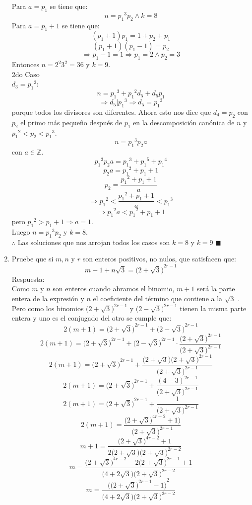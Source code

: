 \documentclass{book}
\newcommand{\Z}{\mathbb{Z}} \def\max{\mathop{\mbox{\rm máx}}} %
\begin{document}
\begin{enumerate}
Para $a= p_1$ se tiene que:
$$n={p_ 1}^3 p_2  \wedge k=8$$
Para $a= p_1 +1$ se tiene que:
$$(p_1+1) p_1 =1+p_2+p_1$$
$$(p_1 +1)(p_1 -1)=p_2$$
$$\Rightarrow p_1-1=1 \Rightarrow p_1 =2 \wedge p_2 =3$$
Entonces $n=2^2 3^2=36$ y $k=9$.\\
2do Caso\\ 
$d_3={p_1}^2$:
$$n={p_1}^3+{p_1}^2 d_5+d_5 p_1$$
$$\Rightarrow d_5|{p_1}^3   \Rightarrow d_5={p_1}^3$$
porque todos los divisores son diferentes.
Ahora esto nos dice que $d_4= p_2$ con $p_2$ el primo más pequeño después de $p_1$ en la descomposición canónica de $n$ y ${p_1}^2<p_2<{p_1}^3$.
$$n={p_1}^3 p_2 a$$ 
con $a\in\Z$.
$${p_1}^3 p_2 a ={p_1}^3+{p_1}^5+{p_1}^4$$
$$p_2 a ={p_1}^2+p_1+1$$
$$p_2  =\frac{{p_1}^2+p_1+1}{a}$$
$$\Rightarrow {p_1}^2<\frac{{p_1}^2+p_1+1}{a}<{p_1}^3$$
$$\Rightarrow {p_1}^2 a<{p_1}^2+p_1+1$$ pero ${p_1}^2>p_1+1\Rightarrow a=1$.\\
Luego $n={p_1}^3 p_2$  y $k=8$.\\
$\therefore$ Las soluciones que nos arrojan todos los casos son $k=8$ y $k=9$ $\blacksquare$\\
			\item Pruebe que si $m,n$  y $r$  son enteros positivos, no nulos, que satisfacen que:  
			$$m+1+n\sqrt{3}={\big(2+\sqrt{3}\big)}^{2r-1}$$
			Respuesta:\\
			Como $m$ y $n$ son enteros cuando abramos el binomio, $m+1$ será la parte entera de la expresión y $n$ el coeficiente del término que contiene a la $\sqrt{3}$ .\\
Pero como los binomios ${\big(2+\sqrt{3}\big)}^{2r-1}$ y ${\big(2-\sqrt{3}\big)}^{2r-1}$ tienen la misma parte entera y uno es el conjugado del otro se cumple que:
$$2(m+1)={\big(2+\sqrt{3}\big)}^{2r-1}+{\big(2-\sqrt{3}\big)}^{2r-1}$$
$$2(m+1)={\big(2+\sqrt{3}\big)}^{2r-1}+{\big(2-\sqrt{3}\big)}^{2r-1}\cdot\frac{{\big(2+\sqrt{3}\big)}^{2r-1}}{{\big(2+\sqrt{3}\big)}^{2r-1}}$$ 
$$2(m+1)={\big(2+\sqrt{3}\big)}^{2r-1}+\frac{{\big(2+\sqrt{3}\big)\big(2+\sqrt{3}\big)}^{2r-1}}{{\big(2+\sqrt{3}\big)}^{2r-1}} $$
$$2(m+1)={\big(2+\sqrt{3}\big)}^{2r-1}+\frac{{(4-3)}^{2r-1}}{{\big(2+\sqrt{3}\big)}^{2r-1}} $$
$$2(m+1)={\big(2+\sqrt{3}\big)}^{2r-1}+\frac{1}{{\big(2+\sqrt{3}\big)}^{2r-1}}$$ 
$$2(m+1)=\frac{{\big(2+\sqrt{3}\big)}^{4r-2}+1)}{{\big(2+\sqrt{3}\big)}^{2r-1}}$$ 
$$m+1=\frac{{\big(2+\sqrt{3}\big)}^{4r-2}+1}{2\big(2+\sqrt{3}\big){\big(2+\sqrt{3}\big)}^{2r-2}}$$
$$m=\frac{{\big(2+\sqrt{3}\big)}^{4r-2}-2{\big(2+\sqrt{3}\big)}^{2r-1}+1}{\big(4+2\sqrt{3}\big){\big(2+\sqrt{3}\big)}^{2r-2} }$$
$$m=\frac{{\Big({\big(2+\sqrt{3}\big)}^{2r-1}-1\Big)}^2}{ \big(4+2\sqrt{3}\big){\big(2+\sqrt{3}\big)}^{2r-2} }$$

\end{enumerate}
\end{document}
